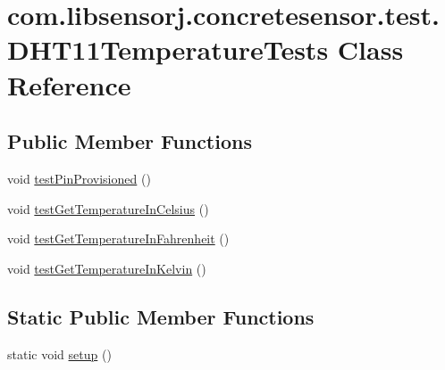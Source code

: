 \hypertarget{classcom_1_1libsensorj_1_1concretesensor_1_1test_1_1DHT11TemperatureTests}{}\section{com.\+libsensorj.\+concretesensor.\+test.\+D\+H\+T11\+Temperature\+Tests Class Reference}
\label{classcom_1_1libsensorj_1_1concretesensor_1_1test_1_1DHT11TemperatureTests}
\subsection*{Public Member Functions}
\begin{DoxyCompactItemize}
\item 
void \hyperlink{classcom_1_1libsensorj_1_1concretesensor_1_1test_1_1DHT11TemperatureTests_a45f30914d4e9956bd21d0e2b5f05554d}{test\+Pin\+Provisioned} ()
\item 
void \hyperlink{classcom_1_1libsensorj_1_1concretesensor_1_1test_1_1DHT11TemperatureTests_a34d4111d60b72ecf413072fe5069ab4c}{test\+Get\+Temperature\+In\+Celsius} ()
\item 
void \hyperlink{classcom_1_1libsensorj_1_1concretesensor_1_1test_1_1DHT11TemperatureTests_a1e1ecc5c963b8cbf3e882e925fcf9bad}{test\+Get\+Temperature\+In\+Fahrenheit} ()
\item 
void \hyperlink{classcom_1_1libsensorj_1_1concretesensor_1_1test_1_1DHT11TemperatureTests_a47e9ab518974b27fa28b0fde184193ea}{test\+Get\+Temperature\+In\+Kelvin} ()
\end{DoxyCompactItemize}
\subsection*{Static Public Member Functions}
\begin{DoxyCompactItemize}
\item 
static void \hyperlink{classcom_1_1libsensorj_1_1concretesensor_1_1test_1_1DHT11TemperatureTests_a1bc150d93e863d5d10ec0a16ae44779b}{setup} ()
\end{DoxyCompactItemize}
